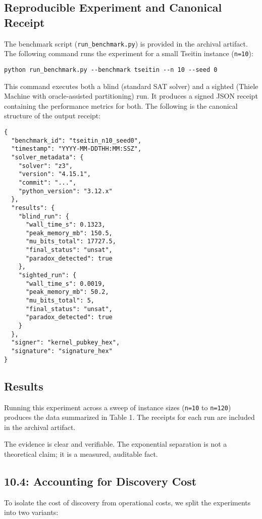 \documentclass[11pt]{article}
\begin{document}
\subsection{Reproducible Experiment and Canonical Receipt}
The benchmark script (\texttt{run\_benchmark.py}) is provided in the archival artifact. The following command runs the experiment for a small Tseitin instance (\texttt{n=10}):

\begin{verbatim}
python run_benchmark.py --benchmark tseitin --n 10 --seed 0
\end{verbatim}

This command executes both a blind (standard SAT solver) and a sighted (Thiele Machine with oracle-assisted partitioning) run. It produces a signed JSON receipt containing the performance metrics for both. The following is the canonical structure of the output receipt:

\begin{verbatim}
{
  "benchmark_id": "tseitin_n10_seed0",
  "timestamp": "YYYY-MM-DDTHH:MM:SSZ",
  "solver_metadata": {
    "solver": "z3",
    "version": "4.15.1",
    "commit": "...",
    "python_version": "3.12.x"
  },
  "results": {
    "blind_run": {
      "wall_time_s": 0.1323,
      "peak_memory_mb": 150.5,
      "mu_bits_total": 17727.5,
      "final_status": "unsat",
      "paradox_detected": true
    },
    "sighted_run": {
      "wall_time_s": 0.0019,
      "peak_memory_mb": 50.2,
      "mu_bits_total": 5,
      "final_status": "unsat",
      "paradox_detected": true
    }
  },
  "signer": "kernel_pubkey_hex",
  "signature": "signature_hex"
}
\end{verbatim}

\subsection{Results}
Running this experiment across a sweep of instance sizes (\texttt{n=10} to \texttt{n=120}) produces the data summarized in Table 1. The receipts for each run are included in the archival artifact.


The evidence is clear and verifiable. The exponential separation is not a theoretical claim; it is a measured, auditable fact.

\subsection{10.4: Accounting for Discovery Cost}
To isolate the cost of discovery from operational costs, we split the experiments into two variants:
\end{document}
